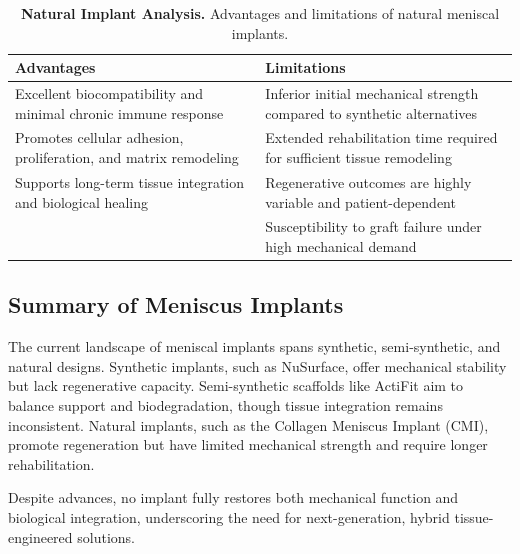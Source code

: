 \begin{table}[H]
\centering
\renewcommand{\arraystretch}{1.3}
\setlength{\tabcolsep}{10pt}
\begin{tabular}{|p{6cm}|p{6cm}|}
\hline
\rowcolor{blue!20}
\textbf{Advantages} & \textbf{Limitations} \\ \hline
Excellent biocompatibility and minimal chronic immune response & Inferior initial mechanical strength compared to synthetic alternatives \\ \hline
Promotes cellular adhesion, proliferation, and matrix remodeling & Extended rehabilitation time required for sufficient tissue remodeling \\ \hline
Supports long-term tissue integration and biological healing & Regenerative outcomes are highly variable and patient-dependent \\ \hline
\multicolumn{1}{|c|}{} & Susceptibility to graft failure under high mechanical demand \\ \hline
\end{tabular}
\caption{\textbf{Natural Implant Analysis.} Advantages and limitations of natural meniscal implants.}\label{tab:natural_implants}
\end{table}


\subsection{Summary of Meniscus Implants}
The current landscape of meniscal implants spans synthetic, semi-synthetic, and natural designs. Synthetic implants, such as NuSurface, offer mechanical stability but lack regenerative capacity. Semi-synthetic scaffolds like ActiFit aim to balance support and biodegradation, though tissue integration remains inconsistent. Natural implants, such as the Collagen Meniscus Implant (CMI), promote regeneration but have limited mechanical strength and require longer rehabilitation.

Despite advances, no implant fully restores both mechanical function and biological integration, underscoring the need for next-generation, hybrid tissue-engineered solutions.

